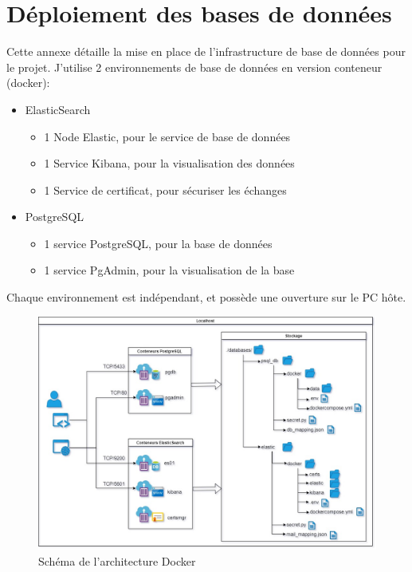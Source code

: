 \documentclass[a4paper,12pt]{article}
\begin{document}
\section{Déploiement des bases de données}	
	Cette annexe détaille la mise en place de l'infrastructure de base de données pour le projet.
	J'utilise 2 environnements de base de données en version conteneur (docker):
		\begin{itemize}
			\item ElasticSearch
				\begin{itemize}
					\item 1 Node Elastic, pour le service de base de données
					\item 1 Service Kibana, pour la visualisation des données
					\item 1 Service de certificat, pour sécuriser les échanges
				\end{itemize}
			\item PostgreSQL
				\begin{itemize}
					\item 1 service PostgreSQL, pour la base de données
					\item 1 service PgAdmin, pour la visualisation de la base
				\end{itemize}
		\end{itemize}
		
	Chaque environnement est indépendant, et possède une ouverture sur le PC hôte.
	
	
	\begin{figure}[H]
		\includegraphics[width=\linewidth]{img/SchemaDocker.jpg}
		\caption{Schéma de l'architecture Docker}
	\end{figure}
	
\end{document}
